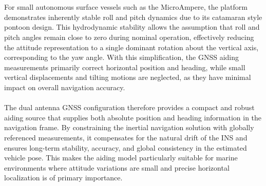 \\ \\
For small autonomous surface vessels such as the MicroAmpere, the platform demonstrates inherently stable roll and pitch dynamics due to its catamaran style pontoon design. This hydrodynamic stability allows the assumption that roll and pitch angles remain close to zero during nominal operation, effectively reducing the attitude representation to a single dominant rotation about the vertical axis, corresponding to the yaw angle. With this simplification, the GNSS aiding measurements primarily correct horizontal position and heading, while small vertical displacements and tilting motions are neglected, as they have minimal impact on overall navigation accuracy.  
\\ \\
The dual antenna GNSS configuration therefore provides a compact and robust aiding source that supplies both absolute position and heading information in the navigation frame. By constraining the inertial navigation solution with globally referenced measurements, it compensates for the natural drift of the INS and ensures long-term stability, accuracy, and global consistency in the estimated vehicle pose. This makes the aiding model particularly suitable for marine environments where attitude variations are small and precise horizontal localization is of primary importance.



